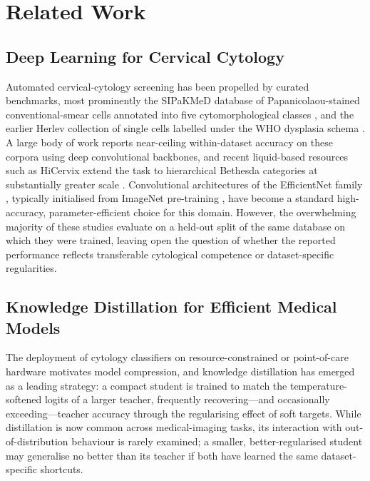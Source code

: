\documentclass[twocolumn]{article}
\begin{document}
\section{Related Work}

\subsection{Deep Learning for Cervical Cytology}
Automated cervical-cytology screening has been propelled by curated benchmarks, most prominently the SIPaKMeD database of Papanicolaou-stained conventional-smear cells annotated into five cytomorphological classes \citep{plissiti2018sipakmed}, and the earlier Herlev collection of single cells labelled under the WHO dysplasia schema \citep{jantzen2005herlev}. A large body of work reports near-ceiling within-dataset accuracy on these corpora using deep convolutional backbones, and recent liquid-based resources such as HiCervix extend the task to hierarchical Bethesda categories at substantially greater scale \citep{cai2024hicervix,nayar2015bethesda}. Convolutional architectures of the EfficientNet family \citep{tan2019efficientnet}, typically initialised from ImageNet pre-training \citep{deng2009imagenet}, have become a standard high-accuracy, parameter-efficient choice for this domain. However, the overwhelming majority of these studies evaluate on a held-out split of the same database on which they were trained, leaving open the question of whether the reported performance reflects transferable cytological competence or dataset-specific regularities.

\subsection{Knowledge Distillation for Efficient Medical Models}
The deployment of cytology classifiers on resource-constrained or point-of-care hardware motivates model compression, and knowledge distillation \citep{hinton2015distilling} has emerged as a leading strategy: a compact student is trained to match the temperature-softened logits of a larger teacher, frequently recovering---and occasionally exceeding---teacher accuracy through the regularising effect of soft targets. While distillation is now common across medical-imaging tasks, its interaction with out-of-distribution behaviour is rarely examined; a smaller, better-regularised student may generalise no better than its teacher if both have learned the same dataset-specific shortcuts.
\end{document}
